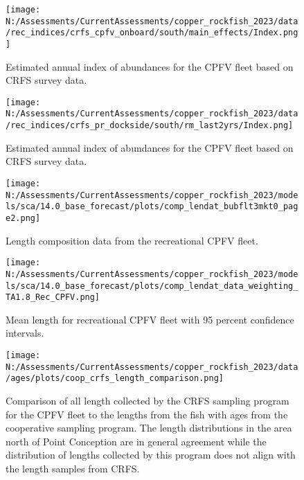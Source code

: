 \documentclass[11pt,
  english,
  letterpaper,
]{article}
\begin{document}
\pagebreak

\begin{figure}
\centering
\texttt{[image: N:/Assessments/CurrentAssessments/copper\_rockfish\_2023/data/rec\_indices/crfs\_cpfv\_onboard/south/main\_effects/Index.png]}
\caption{Estimated annual index of abundances for the CPFV fleet based on CRFS survey data.\label{fig:crfs-index-main}}
\end{figure}

\pagebreak

\begin{figure}
\centering
\texttt{[image: N:/Assessments/CurrentAssessments/copper\_rockfish\_2023/data/rec\_indices/crfs\_pr\_dockside/south/rm\_last2yrs/Index.png]}
\caption{Estimated annual index of abundances for the CPFV fleet based on CRFS survey data.\label{fig:crfs-pr-index-main}}
\end{figure}

\pagebreak

\begin{figure}
\centering
\texttt{[image: N:/Assessments/CurrentAssessments/copper\_rockfish\_2023/models/sca/14.0\_base\_forecast/plots/comp\_lendat\_bubflt3mkt0\_page2.png]}
\caption{Length composition data from the recreational CPFV fleet.\label{fig:rec-cpfv-len-data}}
\end{figure}

\pagebreak

\begin{figure}
\centering
\texttt{[image: N:/Assessments/CurrentAssessments/copper\_rockfish\_2023/models/sca/14.0\_base\_forecast/plots/comp\_lendat\_data\_weighting\_TA1.8\_Rec\_CPFV.png]}
\caption{Mean length for recreational CPFV fleet with 95 percent confidence intervals.\label{fig:mean-rec-cpfv-len-data}}
\end{figure}

\pagebreak

\begin{figure}
\centering
\texttt{[image: N:/Assessments/CurrentAssessments/copper\_rockfish\_2023/data/ages/plots/coop\_crfs\_length\_comparison.png]}
\caption{Comparison of all length collected by the CRFS sampling program for the CPFV fleet to the lengths from the fish with ages from the cooperative sampling program. The length distributions in the area north of Point Conception are in general agreement while the distribution of lengths collected by this program does not align with the length samples from CRFS.\label{fig:coop-len-comparison}}
\end{figure}
\end{document}
